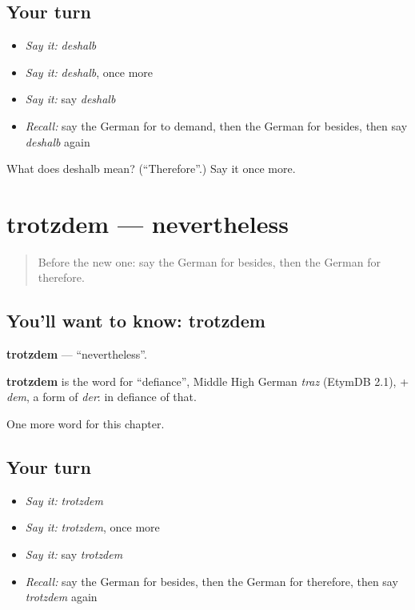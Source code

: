 \subsection*{Your turn}
\begin{itemize}
\raggedright
  \item \emph{Say it:} \emph{deshalb}
  \item \emph{Say it:} \emph{deshalb}, once more
  \item \emph{Say it:} say \emph{deshalb}
  \item \emph{Recall:} say the German for to demand, then the German for besides, then say \emph{deshalb} again
\end{itemize}

\begin{tcolorbox}[breakable,colback=teal!4,colframe=teal!35!black,title={Before you move on}]
What does deshalb mean? (\textquotedblleft{}Therefore\textquotedblright{}.) Say it once more.
\end{tcolorbox}
\section[trotzdem]{trotzdem — nevertheless}

\label{lesson:GE-C250-trotzdem}



\begin{quote}
Before the new one: say the German for besides, then the German for therefore.
\end{quote}

\subsection*{You'll want to know: trotzdem}
\textbf{trotzdem} — \textquotedblleft{}nevertheless\textquotedblright{}.

\begin{cousinweb}
\textbf{trotzdem} is the word for \textquotedblleft{}defiance\textquotedblright{}, Middle High German \emph{traz} (EtymDB 2.1), + \emph{dem}, a form of \emph{der}: in defiance of that.
\end{cousinweb}

\begin{grammarlens}[title={What you've built}]
One more word for this chapter.
\end{grammarlens}

\subsection*{Your turn}
\begin{itemize}
\raggedright
  \item \emph{Say it:} \emph{trotzdem}
  \item \emph{Say it:} \emph{trotzdem}, once more
  \item \emph{Say it:} say \emph{trotzdem}
  \item \emph{Recall:} say the German for besides, then the German for therefore, then say \emph{trotzdem} again
\end{itemize}


